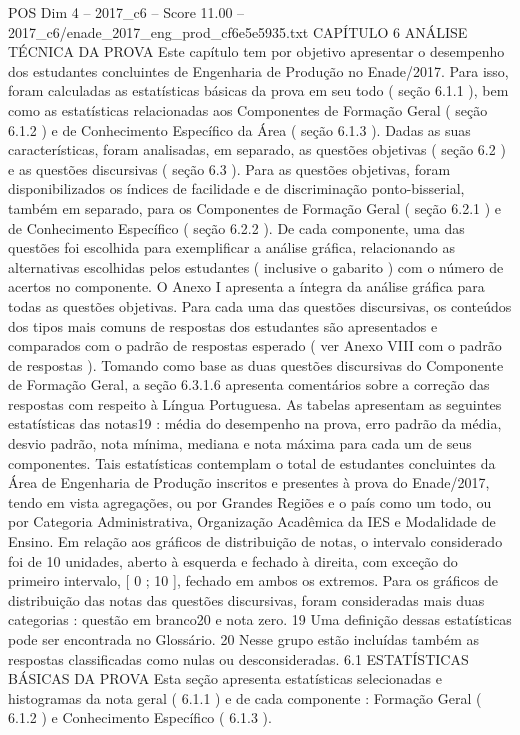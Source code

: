 \begin{textsample}{POS Dim 4 – 2017\_c6 – Score 11.00 – 2017\_c6/enade\_2017\_eng\_prod\_cf6e5e5935.txt}  \label{ex:f4_pos_033}
CAPÍTULO 6 ANÁLISE TÉCNICA DA PROVA Este capítulo tem por objetivo apresentar o desempenho dos estudantes concluintes de Engenharia de Produção no Enade/2017.
Para isso, foram calculadas as estatísticas básicas da prova em seu todo ( seção 6.1.1 ), bem como as estatísticas relacionadas aos Componentes de Formação Geral ( seção 6.1.2 ) e de Conhecimento Específico da Área ( seção 6.1.3 ).
Dadas as suas características, foram analisadas, em separado, as questões objetivas ( seção 6.2 ) e as questões discursivas ( seção 6.3 ).
Para as questões objetivas, foram disponibilizados os índices de facilidade e de discriminação ponto-bisserial, também em separado, para os Componentes de Formação Geral ( seção 6.2.1 ) e de Conhecimento Específico ( seção 6.2.2 ).
De cada componente, uma das questões foi escolhida para exemplificar a análise gráfica, relacionando as alternativas escolhidas pelos estudantes ( inclusive o gabarito ) com o número de acertos no componente.
O Anexo I apresenta a íntegra da análise gráfica para todas as questões objetivas.
Para cada uma das questões discursivas, os conteúdos dos tipos mais comuns de respostas dos estudantes são apresentados e comparados com o padrão de respostas esperado ( ver Anexo VIII com o padrão de respostas ).
Tomando como base as duas questões discursivas do Componente de Formação Geral, a seção 6.3.1.6 apresenta comentários sobre a correção das respostas com respeito à Língua Portuguesa.
As tabelas apresentam as seguintes estatísticas das notas19 : média do desempenho na prova, erro padrão da média, desvio padrão, nota mínima, mediana e nota máxima para cada um de seus componentes.
Tais estatísticas contemplam o total de estudantes concluintes da Área de Engenharia de Produção inscritos e presentes à prova do Enade/2017, tendo em vista agregações, ou por Grandes Regiões e o país como um todo, ou por Categoria Administrativa, Organização Acadêmica da IES e Modalidade de Ensino.
Em relação aos gráficos de distribuição de notas, o intervalo considerado foi de 10 unidades, aberto à esquerda e fechado à direita, com exceção do primeiro intervalo, [ 0 ; 10 ], fechado em ambos os extremos.
Para os gráficos de distribuição das notas das questões discursivas, foram consideradas mais duas categorias : questão em branco20 e nota zero. 19 Uma definição dessas estatísticas pode ser encontrada no Glossário. 20 Nesse grupo estão incluídas também as respostas classificadas como nulas ou desconsideradas. 6.1 ESTATÍSTICAS BÁSICAS DA PROVA Esta seção apresenta estatísticas selecionadas e histogramas da nota geral ( 6.1.1 ) e de cada componente : Formação Geral ( 6.1.2 ) e Conhecimento Específico ( 6.1.3 ).

\end{textsample}
